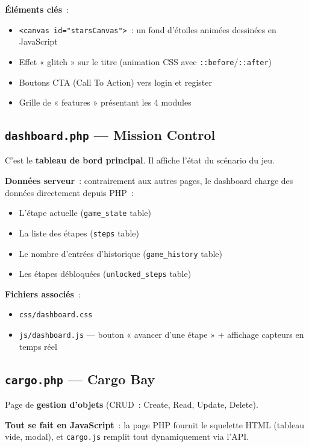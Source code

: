 \documentclass[12pt,a4paper]{article}
\begin{document}
\textbf{Éléments clés}~:
\begin{itemize}
    \item \texttt{<canvas id="starsCanvas">}~: un fond d'étoiles animées dessinées en JavaScript
    \item Effet « glitch » sur le titre (animation CSS avec \texttt{::before}/\texttt{::after})
    \item Boutons CTA (Call To Action) vers login et register
    \item Grille de « features » présentant les 4 modules
\end{itemize}

\subsection{\texttt{dashboard.php} --- Mission Control}

C'est le \textbf{tableau de bord principal}. Il affiche l'état du scénario du jeu.

\textbf{Données serveur}~: contrairement aux autres pages, le dashboard charge des données directement depuis PHP~:
\begin{itemize}
    \item L'étape actuelle (\texttt{game\_state} table)
    \item La liste des étapes (\texttt{steps} table)
    \item Le nombre d'entrées d'historique (\texttt{game\_history} table)
    \item Les étapes débloquées (\texttt{unlocked\_steps} table)
\end{itemize}

\textbf{Fichiers associés}~:
\begin{itemize}
    \item \texttt{css/dashboard.css}
    \item \texttt{js/dashboard.js} --- bouton « avancer d'une étape » + affichage capteurs en temps réel
\end{itemize}

\subsection{\texttt{cargo.php} --- Cargo Bay}

Page de \textbf{gestion d'objets} (CRUD~: Create, Read, Update, Delete).

\textbf{Tout se fait en JavaScript}~: la page PHP fournit le squelette HTML (tableau vide, modal), et \texttt{cargo.js} remplit tout dynamiquement via l'API.
\end{document}
